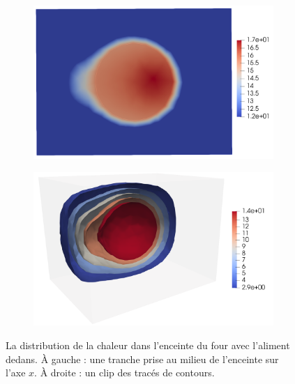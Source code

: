 \begin{figure}[H]
    \centering
    \begin{subfigure}{.5\textwidth}
        \centering
        \includegraphics[scale=0.15]{figures/chaleur/chaleur1.png}
    \end{subfigure}%
    \begin{subfigure}{.5\textwidth}
        \centering
        \includegraphics[scale=0.15]{figures/chaleur/chaleur2.png}
    \end{subfigure}
    \caption{La distribution de la chaleur dans l'enceinte du four
    avec l'aliment dedans.
    À gauche : une tranche prise au milieu de l'enceinte sur l'axe $x$.
    À droite : un clip des tracés de contours.}
\end{figure}
